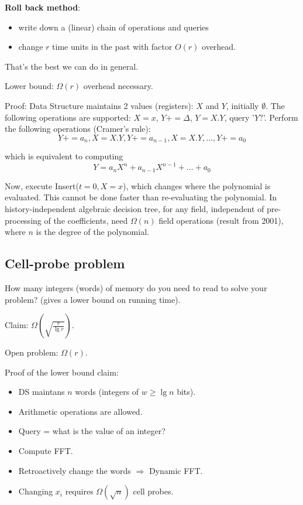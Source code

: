 \documentclass[11pt]{article}
\begin{document}
{\bf Roll back method}: 
\begin{itemize}
\item write down a (linear) chain of operations and queries
\item change $r$ time units in the past with factor $O(r)$ overhead. 
\end{itemize}

That's the best we can do in general. 

Lower bound: $\Omega (r)$ overhead necessary.

Proof: Data Structure maintains 2 values (registers): $X$ and $Y$, initially $\emptyset$. The following operations are supported: $X = x$, $Y += \Delta$, $Y = X.Y$, query '$Y?$'. Perform the following operations (Cramer's rule):
$$Y += a_n, X = X.Y, Y += a_{n-1}, X = X.Y, \ldots, Y += a_0$$


which is equivalent to computing $$Y = a_n X^{n} + a_{n-1} X^{n-1} + ... + a_0$$

Now, execute Insert($t = 0, X=x$), which changes where the polynomial is evaluated. This cannot be done faster than re-evaluating the polynomial. In history-independent algebraic decision tree, for any field, independent of pre-processing of the coefficients, need $\Omega(n)$ field operations (result from 2001), where $n$ is the degree of the polynomial.

\subsection{Cell-probe problem}

How many integers (words) of memory do you need to read to solve your problem? (gives a lower bound on running time).

Claim: $\Omega(\sqrt{\frac{r}{\lg{r}}})$.

Open problem: $\Omega(r)$.

Proof of the lower bound claim:
\begin{itemize}
\item DS maintans $n$ words (integers of $w \ge \lg{n}$ bits). 
\item Arithmetic operations are allowed. 
\item Query = what is the value of an integer?
\item Compute FFT. 
\item Retroactively change the words $\Rightarrow$ Dynamic FFT. 
\item Changing $x_i$ requires $\Omega(\sqrt{n})$ cell probes.
\end{itemize}
\end{document}
